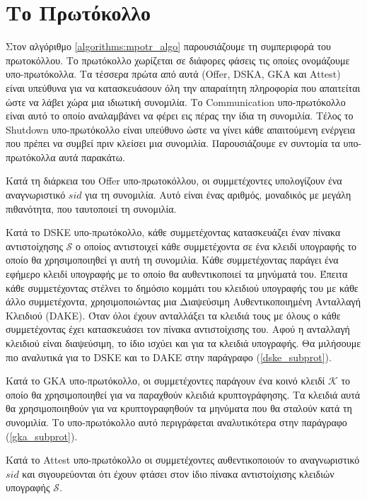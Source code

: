 \section{Το Πρωτόκολλο}

Στον αλγόριθμο \ref{algorithms:mpotr_algo} παρουσιάζουμε τη συμπεριφορά του πρωτοκόλλου.
Το πρω\-τό\-κολ\-λο χωρίζεται σε διάφορες φάσεις τις οποίες ονομάζουμε υπο-πρωτόκολλα.
Τα τέσσερα πρώτα από αυτά (Offer, DSKA, GKA και Attest) είναι υπεύθυνα για να κατασκευάσουν όλη την απαραίτητη πληροφορία που απαιτείται ώστε να λάβει χώρα μια ιδιωτική συνομιλία.
Το Communication υπο-πρωτόκολλο είναι αυτό το οποίο αναλαμβάνει να φέρει εις πέρας την ίδια τη συνομιλία.
Τέλος το Shutdown υπο-πρωτόκολλο είναι υπεύθυνο ώστε να γίνει κάθε απαιτούμενη ενέργεια που πρέπει να συμβεί πριν κλείσει μια συνομιλία.
Παρουσιάζουμε εν συντομία τα υπο-πρωτόκολλα αυτά παρακάτω.

Κατά τη διάρκεια του Offer υπο-πρωτοκόλλου, οι συμμετέχοντες υπολογίζουν ένα αναγνωριστικό $sid$ για τη συνομιλία.
Αυτό είναι ένας αριθμός, μοναδικός με μεγάλη πιθανότητα, που ταυτοποιεί τη συνομιλία.

Κατά το DSKE υπο-πρωτόκολλο, κάθε συμμετέχοντας κατασκευάζει έναν πί\-να\-κα αντιστοίχησης $\mathcal{S}$ ο οποίος αντιστοιχεί κάθε συμμετέχοντα σε ένα κλειδί υ\-πο\-γρα\-φής το οποίο θα χρησιμοποιηθεί γι αυτή τη συνομιλία.
Κάθε συμμετέχοντας παράγει ένα εφήμερο κλειδί υπογραφής με το οποίο θα αυθεντικοποιεί τα μηνύματά του.
Έπειτα κάθε συμμετέχοντας στέλνει το δημόσιο κομμάτι του κλειδιού υπογραφής του με κάθε άλλο συμμετέχοντα, χρησιμοποιώντας μια Διαψεύσιμη Αυθεντικοποιημένη Ανταλλαγή Κλειδιού (DAKE).
Όταν όλοι έχουν ανταλλάξει τα κλειδιά τους με όλους ο κάθε συμμετέχοντας έχει κατασκευάσει τον πίνακα αντιστοίχισης του.
Αφού η ανταλλαγή κλειδιού είναι διαψεύσιμη, το ίδιο ισχύει και για τα κλειδιά υπογραφής.
Θα μιλήσουμε πιο αναλυτικά για το DSKE και το DAKE στην παράγραφο (\ref{dske_subprot}).

Κατά το GKA υπο-πρωτόκολλο, οι συμμετέχοντες παράγουν ένα κοινό κλειδί $\mathcal{K}$ το οποίο θα χρησιμοποιηθεί για να παραχθούν κλειδιά κρυπτογράφησης.
Τα κλειδιά αυτά θα χρησιμοποιηθούν για να κρυπτογραφηθούν τα μηνύματα που θα σταλούν κατά τη συνομιλία.
Το υπο-πρωτόκολλο αυτό περιγράφεται αναλυτικότερα στην παράγραφο (\ref{gka_subprot}).

Κατά το Attest υπο-πρωτόκολλο οι συμμετέχοντες αυθεντικοποιούν το α\-να\-γνω\-ρι\-στι\-κό $sid$ και σιγουρεύονται ότι έχουν φτάσει στον ίδιο πίνακα αντιστοίχισης κλειδιών υπογραφής $\mathcal{S}$.

